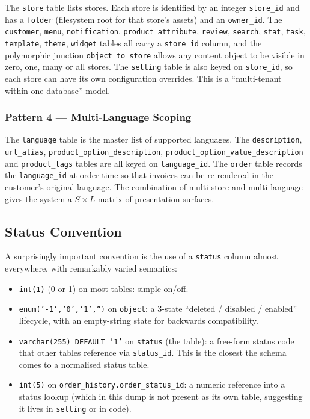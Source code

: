 \documentclass[11pt,a4paper]{article}
\begin{document}
The \texttt{store} table lists stores. Each store is identified by
an integer \texttt{store\_id} and has a \texttt{folder} (filesystem
root for that store's assets) and an \texttt{owner\_id}. The
\texttt{customer}, \texttt{menu}, \texttt{notification},
\texttt{product\_attribute}, \texttt{review}, \texttt{search},
\texttt{stat}, \texttt{task}, \texttt{template}, \texttt{theme},
\texttt{widget} tables all carry a \texttt{store\_id} column, and
the polymorphic junction \texttt{object\_to\_store} allows any
content object to be visible in zero, one, many or all stores.
The \texttt{setting} table is also keyed on \texttt{store\_id}, so
each store can have its own configuration overrides. This is a
``multi-tenant within one database'' model.

\subsubsection{Pattern 4 --- Multi-Language Scoping}

The \texttt{language} table is the master list of supported
languages. The \texttt{description}, \texttt{url\_alias},
\texttt{product\_option\_description},
\texttt{product\_option\_value\_description} and
\texttt{product\_tags} tables are all keyed on
\texttt{language\_id}. The \texttt{order} table records the
\texttt{language\_id} at order time so that invoices can be
re-rendered in the customer's original language. The combination
of multi-store and multi-language gives the system a $S \times L$
matrix of presentation surfaces.

\subsection{Status Convention}

A surprisingly important convention is the use of a
\texttt{status} column almost everywhere, with remarkably varied
semantics:

\begin{itemize}[leftmargin=1.6em,itemsep=2pt]
  \item \texttt{int(1)} (0 or 1) on most tables: simple on/off.
  \item \texttt{enum('-1','0','1','')} on \texttt{object}: a 3-state
        ``deleted / disabled / enabled'' lifecycle, with an empty-string
        state for backwards compatibility.
  \item \texttt{varchar(255) DEFAULT '1'} on \texttt{status} (the table):
        a free-form status code that other tables reference via
        \texttt{status\_id}. This is the closest the schema comes to a
        normalised status table.
  \item \texttt{int(5)} on \texttt{order\_history.order\_status\_id}:
        a numeric reference into a status lookup (which in this dump
        is not present as its own table, suggesting it lives in
        \texttt{setting} or in code).
\end{itemize}
\end{document}
